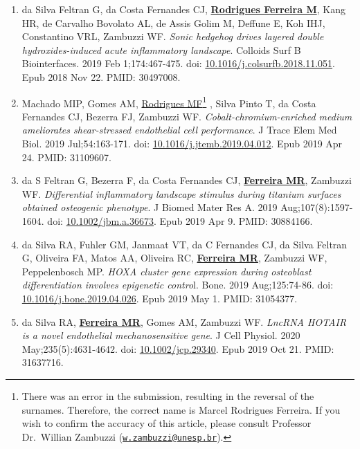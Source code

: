 \documentclass[
  letterpaper,
  DIV=11,
  numbers=noendperiod]{scrartcl}
\begin{document}
\begin{enumerate}
  \href{https://www.doi.org/10.1016/j.mce.2018.08.008}{10.1016/j.mce.2018.08.008}.
  Epub 2018 Aug 22. PMID: 30142372.
\item
  da Silva Feltran G, da Costa Fernandes CJ, \ul{\textbf{Rodrigues
  Ferreira M}}, Kang HR, de Carvalho Bovolato AL, de Assis Golim M,
  Deffune E, Koh IHJ, Constantino VRL, Zambuzzi WF. \emph{Sonic hedgehog
  drives layered double hydroxides-induced acute inflammatory
  landscape}. Colloids Surf B Biointerfaces. 2019 Feb 1;174:467-475.
  doi:
  \href{https://www.doi.org/10.1016/j.colsurfb.2018.11.051}{10.1016/j.colsurfb.2018.11.051}.
  Epub 2018 Nov 22. PMID: 30497008.
\item
  Machado MIP, Gomes AM, \ul{Rodrigues MF}\footnote{There was an error
    in the submission, resulting in the reversal of the surnames.
    Therefore, the correct name is Marcel Rodrigues Ferreira. If you
    wish to confirm the accuracy of this article, please consult
    Professor Dr.~Willian Zambuzzi
    (\href{mailto:w.zambuzzi@unesp.br}{\nolinkurl{w.zambuzzi@unesp.br}}).}
  , Silva Pinto T, da Costa Fernandes CJ, Bezerra FJ, Zambuzzi WF.
  \emph{Cobalt-chromium-enriched medium ameliorates shear-stressed
  endothelial cell performance}. J Trace Elem Med Biol. 2019
  Jul;54:163-171. doi:
  \href{https://www.doi.org/10.1016/j.jtemb.2019.04.012}{10.1016/j.jtemb.2019.04.012}.
  Epub 2019 Apr 24. PMID: 31109607.
\item
  da S Feltran G, Bezerra F, da Costa Fernandes CJ, \ul{\textbf{Ferreira
  MR}}, Zambuzzi WF. \emph{Differential inflammatory landscape stimulus
  during titanium surfaces obtained osteogenic phenotype}. J Biomed
  Mater Res A. 2019 Aug;107(8):1597-1604. doi:
  \href{https://www.doi.org/10.1002/jbm.a.36673}{10.1002/jbm.a.36673}.
  Epub 2019 Apr 9. PMID: 30884166.
\item
  da Silva RA, Fuhler GM, Janmaat VT, da C Fernandes CJ, da Silva
  Feltran G, Oliveira FA, Matos AA, Oliveira RC, \ul{\textbf{Ferreira
  MR}}, Zambuzzi WF, Peppelenbosch MP. \emph{HOXA cluster gene
  expression during osteoblast differentiation involves epigenetic
  contro}l. Bone. 2019 Aug;125:74-86. doi:
  \href{https://www.doi.org/10.1016/j.bone.2019.04.026}{10.1016/j.bone.2019.04.026}.
  Epub 2019 May 1. PMID: 31054377.
\item
  da Silva RA, \ul{\textbf{Ferreira MR}}, Gomes AM, Zambuzzi WF.
  \emph{LncRNA HOTAIR is a novel endothelial mechanosensitive gene}. J
  Cell Physiol. 2020 May;235(5):4631-4642. doi:
  \href{https://www.doi.org/10.1002/jcp.29340}{10.1002/jcp.29340}. Epub
  2019 Oct 21. PMID: 31637716.

\end{enumerate}
\end{document}
